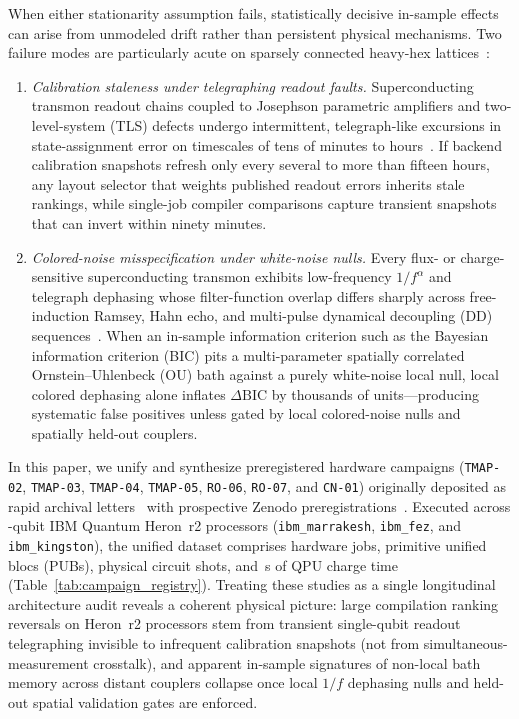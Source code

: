 \documentclass[twocolumn,aps,prapplied,superscriptaddress,floatfix]{revtex4-2}
\begin{document}
When either stationarity assumption fails, statistically decisive in-sample effects can arise from unmodeled drift rather than persistent physical mechanisms. Two failure modes are particularly acute on sparsely connected heavy-hex lattices~\cite{chamberland2020}:
\begin{enumerate}
\item \emph{Calibration staleness under telegraphing readout faults.} Superconducting transmon readout chains coupled to Josephson parametric amplifiers and two-level-system (TLS) defects undergo intermittent, telegraph-like excursions in state-assignment error on timescales of tens of minutes to hours~\cite{klimov2018,thorbeck2023,chen2023}. If backend calibration snapshots refresh only every several to more than fifteen hours, any layout selector that weights published readout errors inherits stale rankings, while single-job compiler comparisons capture transient snapshots that can invert within ninety minutes.
\item \emph{Colored-noise misspecification under white-noise nulls.} Every flux- or charge-sensitive superconducting transmon exhibits low-frequency $1/f^\alpha$ and telegraph dephasing whose filter-function overlap differs sharply across free-induction Ramsey, Hahn echo, and multi-pulse dynamical decoupling (DD) sequences~\cite{cywinski2008,bylander2011}. When an in-sample information criterion such as the Bayesian information criterion (BIC) pits a multi-parameter spatially correlated Ornstein--Uhlenbeck (OU) bath against a purely white-noise local null, local colored dephasing alone inflates $\Delta\mathrm{BIC}$ by thousands of units—producing systematic false positives unless gated by local colored-noise nulls and spatially held-out couplers.
\end{enumerate}

In this paper, we unify and synthesize \NumCampaigns{} preregistered hardware campaigns (\texttt{TMAP-02}, \texttt{TMAP-03}, \texttt{TMAP-04}, \texttt{TMAP-05}, \texttt{RO-06}, \texttt{RO-07}, and \texttt{CN-01}) originally deposited as \NumZenodoLetters{} rapid archival letters~\cite{davis_tmap02,davis_cn01,davis_tmap03,davis_tmap04,davis_tmap05,davis_ro0607} with \NumZenodoPreregs{} prospective Zenodo preregistrations~\cite{prereg_tmap03,prereg_tmap04,prereg_tmap05,prereg_ro06,prereg_ro07}. Executed across \NumBackends{} \ChipQubits{}-qubit IBM Quantum Heron~r2 processors (\texttt{ibm\_marrakesh}, \texttt{ibm\_fez}, and \texttt{ibm\_kingston}), the unified dataset comprises \TotalJobs{} hardware jobs, \TotalPubs{} primitive unified blocs (PUBs), \TotalShots{} physical circuit shots, and \TotalQpuSeconds{}\,s of QPU charge time (Table~\ref{tab:campaign_registry}). Treating these \NumCampaigns{} studies as a single longitudinal architecture audit reveals a coherent physical picture: large compilation ranking reversals on Heron~r2 processors stem from transient single-qubit readout telegraphing invisible to infrequent calibration snapshots (not from simultaneous-measurement crosstalk), and apparent in-sample signatures of non-local bath memory across distant couplers collapse once local $1/f$ dephasing nulls and held-out spatial validation gates are enforced.
\end{document}
